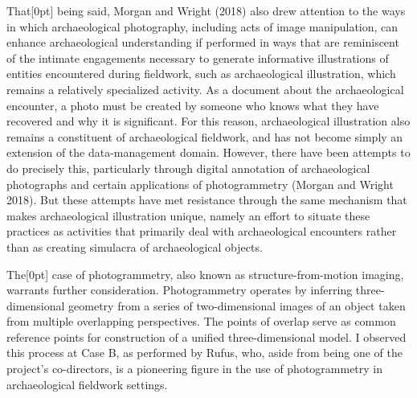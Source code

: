 \documentclass[
]{article}
\newcommand{\paragraphnumber}[1]{\marginnote{\color{lightgray}\tiny{#1}}[0pt]}
\begin{document}
That\paragraphnumber{[62]} being said, Morgan and Wright (2018) also
drew attention to the ways in which archaeological photography,
including acts of image manipulation, can enhance archaeological
understanding if performed in ways that are reminiscent of the intimate
engagements necessary to generate informative illustrations of entities
encountered during fieldwork, such as archaeological illustration, which
remains a relatively specialized activity. As a document about the
archaeological encounter, a photo must be created by someone who knows
what they have recovered and why it is significant. For this reason,
archaeological illustration also remains a constituent of archaeological
fieldwork, and has not become simply an extension of the data-management
domain. However, there have been attempts to do precisely this,
particularly through digital annotation of archaeological photographs
and certain applications of photogrammetry (Morgan and Wright 2018). But
these attempts have met resistance through the same mechanism that makes
archaeological illustration unique, namely an effort to situate these
practices as activities that primarily deal with archaeological
encounters rather than as creating simulacra of archaeological objects.

The\paragraphnumber{[63]} case of photogrammetry, also known as
structure-from-motion imaging, warrants further consideration.
Photogrammetry operates by inferring three-dimensional geometry from a
series of two-dimensional images of an object taken from multiple
overlapping perspectives. The points of overlap serve as common
reference points for construction of a unified three-dimensional model.
I observed this process at Case B, as performed by Rufus, who, aside
from being one of the project's co-directors, is a pioneering figure in
the use of photogrammetry in archaeological fieldwork settings.
\end{document}
